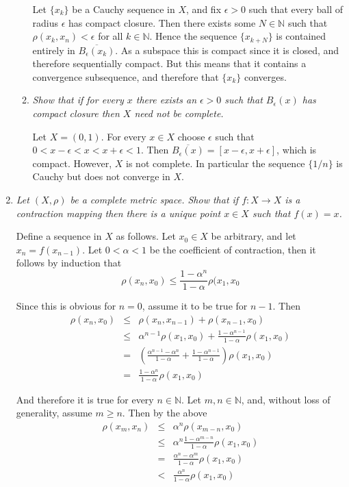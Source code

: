 \documentclass[10pt]{article}
\newcommand{\N}{\mathbb{N}}
\begin{document}
\begin{enumerate}
\begin{enumerate}
Let $\{x_k\}$ be a Cauchy sequence in $X$, and fix $\epsilon > 0$ such that every ball of radius $\epsilon$ has compact closure.  Then there exists some $N \in \N$ such that $\rho(x_k, x_n) < \epsilon$ for all $k \in \N$.  Hence the sequence $\{x_{k+N}\}$ is contained entirely in $\overline{B_\epsilon(x_k)}$.  As a subspace this is compact since it is closed, and therefore sequentially compact.  But this means that it contains a convergence subsequence, and therefore that $\{x_k\}$ converges.

\item \emph{Show that if for every $x$ there exists an $\epsilon > 0$ such that $B_\epsilon(x)$ has compact closure then $X$ need not be complete.}

Let $X = (0,1)$.  For every $x \in X$ choose $\epsilon$ such that $0 < x - \epsilon < x < x + \epsilon < 1$.  Then $\overline{B_\epsilon(x)} = [x-\epsilon, x+\epsilon]$, which is compact.  However, $X$ is not complete.  In particular the sequence $\{1/n\}$ is Cauchy but does not converge in $X$.

\end{enumerate}

\item \emph{Let $(X, \rho)$ be a complete metric space.  Show that if $f: X \rightarrow X$ is a contraction mapping then there is a unique point $x \in X$ such that $f(x) = x$.}

Define a sequence in $X$ as follows.  Let $x_0 \in X$ be arbitrary, and let $x_n = f(x_{n-1})$.  Let $0 < \alpha < 1$ be the coefficient of contraction, then it follows by induction that $$\rho(x_n, x_0) \leq \frac{1-\alpha^n}{1 - \alpha} \rho(x_1, x_0$$

Since this is obvious for $n = 0$, assume it to be true for $n-1$.  Then
\begin{eqnarray*}
\rho(x_n, x_0) &\leq& \rho(x_n, x_{n-1}) + \rho(x_{n-1}, x_0) \\
&\leq& \alpha^{n-1}\rho(x_1, x_0) + \frac{1 - \alpha^{n-1}}{1 - \alpha}\rho(x_1, x_0) \\
&=& \left( \frac{\alpha^{n-1} - \alpha^n}{1 - \alpha} + \frac{1 - \alpha^{n-1}}{1 - \alpha}\right) \rho(x_1, x_0) \\
&=& \frac{1 - \alpha^n}{1 - \alpha} \rho(x_1, x_0)
\end{eqnarray*}

And therefore it is true for every $n \in \N$.  Let $m,n \in \N$, and, without loss of generality, assume $m \geq n$.  Then by the above
\begin{eqnarray*}
\rho(x_m, x_n) &\leq& \alpha^n \rho(x_{m-n}, x_0) \\
&\leq& \alpha^n \frac{1 - \alpha^{m-n}}{1 - \alpha}\rho(x_1, x_0) \\
&=& \frac{\alpha^n - \alpha^m}{1 - \alpha}\rho(x_1, x_0) \\
&<& \frac{\alpha^n}{1 - \alpha}\rho(x_1, x_0)
\end{eqnarray*}


\end{enumerate}
\end{document}
